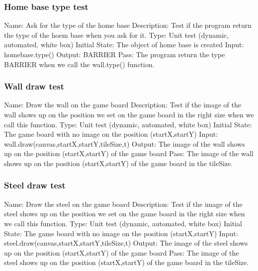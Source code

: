 \documentclass{article}
\begin{document}
\subsubsection{Home base type test}
Name:  Ask for the type of the home base\newline
Description: Test if the program return the type of the hoem base when you ask for it. \newline
Type: Unit test (dynamic, automated, white box) \newline
Initial State:  The object of home base is created \newline
Input: homebase.type()\newline
Output: BARRIER\newline
Pass:  The program return the type BARRIER when we call the wall.type() function. \newline

\subsubsection{Wall draw test}
Name:  Draw the wall on the game board\newline
Description: Test if the image of the wall shows up on the position we set on the game board in the right size when we call this function. \newline
Type: Unit test (dynamic, automated, white box) \newline
Initial State:  The game board with no image on the position (startX,startY) \newline
Input: wall.draw(canvas,startX,startY,tileSize,t)\newline
Output: The image of the wall shows up on the position (startX,startY) of the game board\newline
Pass:  The image of the wall shows up on the position (startX,startY) of the game board in the tileSize. \newline

\subsubsection{Steel draw test}
Name:  Draw the steel on the game board\newline
Description: Test if the image of the steel shows up on the position we set on the game board in the right size when we call this function. \newline
Type: Unit test (dynamic, automated, white box) \newline
Initial State:  The game board with no image on the position (startX,startY) \newline
Input: steel.draw(canvas,startX,startY,tileSize,t)\newline
Output: The image of the steel shows up on the position (startX,startY) of the game board\newline
Pass:  The image of the steel shows up on the position (startX,startY) of the game board in the tileSize. \newline
\end{document}
